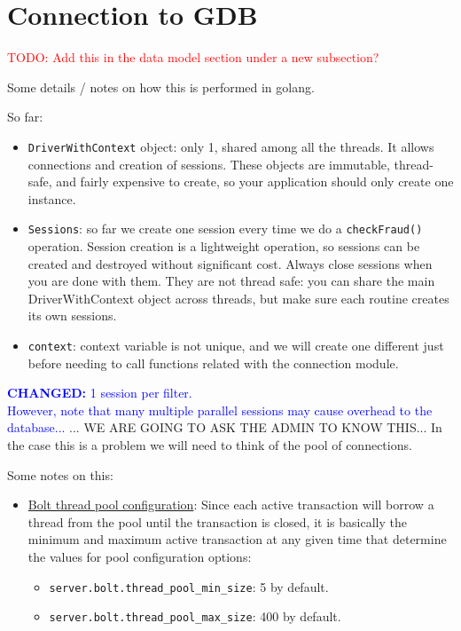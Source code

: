 \documentclass{article}
\begin{document}
\section{Connection to GDB}

\textcolor{red}{TODO: Add this in the data model section under a new subsection?}

Some details / notes on how this is performed in golang.


So far:
\begin{itemize}
  \item \texttt{DriverWithContext} object: only 1, shared among all the threads. It allows connections and creation of sessions. These objects are immutable, thread-safe, and fairly expensive to create, so your application should only create one instance.
  \item \texttt{Sessions}: so far we create one session every time we do a \texttt{checkFraud()} operation.
  Session creation is a lightweight operation, so sessions can be created and destroyed without significant cost. Always close sessions when you are done with them. They are not thread safe: you can share the main DriverWithContext object
  across threads, but make sure each routine creates its own sessions.
  \item \texttt{context}: context variable is not unique, and we will create one different just before needing to call functions related with the connection module.
\end{itemize}


\textcolor{blue}{\textbf{CHANGED:} 1 session per filter.\\
However, note that many multiple parallel sessions may cause overhead to the database...}
... WE ARE GOING TO ASK THE ADMIN TO KNOW THIS... In the case this is a problem we will need
to think of the pool of connections.


Some notes on this:

\begin{itemize}
  \item \href{https://neo4j.com/docs/operations-manual/current/performance/bolt-thread-pool-configuration/}{Bolt thread pool configuration}: Since each active transaction will borrow a thread from the pool until the transaction is closed, it is basically the minimum and maximum active transaction at any given time that determine the values for pool configuration options: 
  \begin{itemize}
    \item \texttt{server.bolt.thread\_pool\_min\_size}: 5 by default.
    \item \texttt{server.bolt.thread\_pool\_max\_size}: 400 by default.
  \end{itemize}
\end{itemize}
\end{document}

